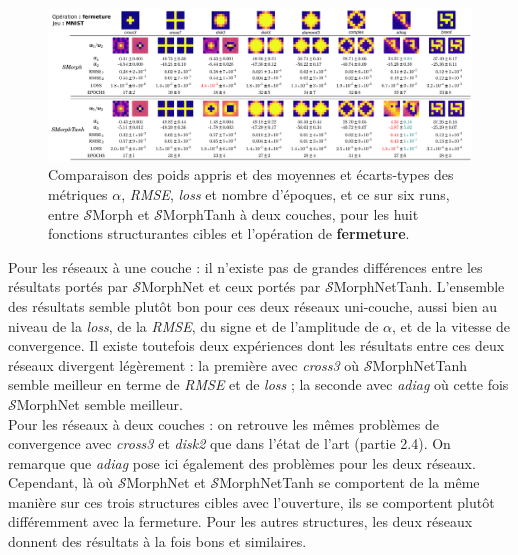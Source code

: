 \vspace{2.0mm}
\begin{figure}[ht]
  \begin{center}
    \includegraphics[width=1.00\textwidth]{parts/3-contributions/A-reseaux_smorphTANH/figures/t_closing_mnist.pdf}
    \vspace{-2.0mm}
    \caption{ \centering Comparaison des poids appris et des moyennes et écarts-types des métriques $\alpha$, \textit{RMSE}, \textit{loss} et nombre d'époques, et ce sur six runs, entre $\mathcal{S}$Morph et $\mathcal{S}$MorphTanh à deux couches, pour les huit fonctions structurantes cibles et l'opération de \textbf{fermeture}.}
    \label{fig:SMvsSMTH_closing_mnist}
  \end{center}
\end{figure}


\vspace{-3.2mm}

\vspace{-1.6mm}
Pour les réseaux à une couche : 
il n'existe pas de grandes différences entre les résultats portés par $\mathcal{S}$MorphNet et ceux portés par $\mathcal{S}$MorphNetTanh. L'ensemble des résultats semble plutôt bon pour ces deux réseaux uni-couche, aussi bien au niveau de la \textit{loss}, de la \textit{RMSE}, du signe et de l'amplitude de $\alpha$, et de la vitesse de convergence. Il existe toutefois deux expériences dont les résultats entre ces deux réseaux divergent légèrement : la première avec \textit{cross3} où $\mathcal{S}$MorphNetTanh semble meilleur en terme de \textit{RMSE} et de \textit{loss} ; la seconde avec \textit{adiag} où cette fois $\mathcal{S}$MorphNet semble meilleur. \\

\vspace{-1.8mm}
\noindent Pour les réseaux à deux couches : 
on retrouve les mêmes problèmes de convergence avec \textit{cross3} et \textit{disk2} que dans l'état de l'art (partie 2.4). On remarque que \textit{adiag} pose ici également des problèmes pour les deux réseaux. Cependant, là où $\mathcal{S}$MorphNet et $\mathcal{S}$MorphNetTanh se comportent de la même manière sur ces trois structures cibles avec l'ouverture, ils se comportent plutôt différemment avec la fermeture. Pour les autres structures, les deux réseaux donnent des résultats à la fois bons et similaires. \\

